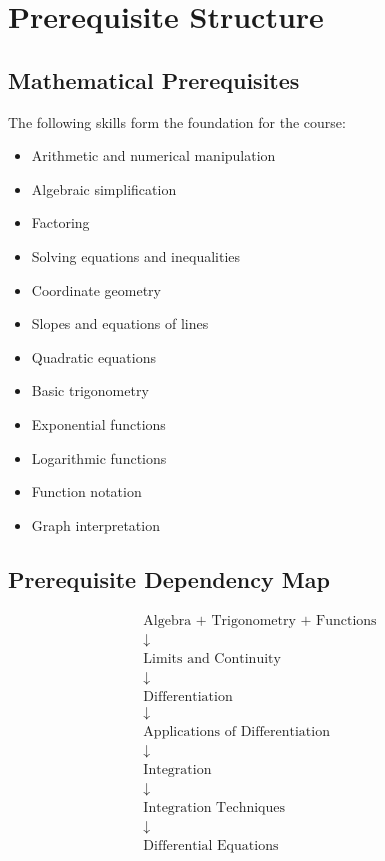 \documentclass[11pt]{article}
\begin{document}

\section{Prerequisite Structure}

\subsection{Mathematical Prerequisites}

The following skills form the foundation for the course:

\begin{itemize}
    \item Arithmetic and numerical manipulation
    \item Algebraic simplification
    \item Factoring
    \item Solving equations and inequalities
    \item Coordinate geometry
    \item Slopes and equations of lines
    \item Quadratic equations
    \item Basic trigonometry
    \item Exponential functions
    \item Logarithmic functions
    \item Function notation
    \item Graph interpretation
\end{itemize}

\subsection{Prerequisite Dependency Map}

\[
\begin{array}{c}
\text{Algebra + Trigonometry + Functions}
\\[0.3cm]
\downarrow
\\[0.3cm]
\text{Limits and Continuity}
\\[0.3cm]
\downarrow
\\[0.3cm]
\text{Differentiation}
\\[0.3cm]
\downarrow
\\[0.3cm]
\text{Applications of Differentiation}
\\[0.3cm]
\downarrow
\\[0.3cm]
\text{Integration}
\\[0.3cm]
\downarrow
\\[0.3cm]
\text{Integration Techniques}
\\[0.3cm]
\downarrow
\\[0.3cm]
\text{Differential Equations}
\end{array}
\]
\end{document}
